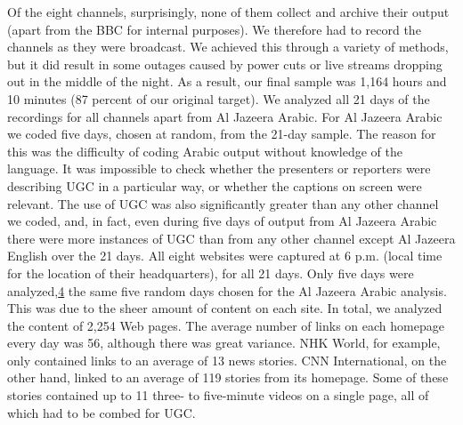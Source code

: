 \documentclass[symmetric, notoc, nobib]{towcenter-book}
\begin{document}
Of the eight channels, surprisingly, none of them collect and archive their
output (apart from the BBC for internal purposes). We therefore had to
record the channels as they were broadcast. We achieved this through a
variety of methods, but it did result in some outages caused by power cuts
or live streams dropping out in the middle of the night. As a result, our final
sample was 1,164 hours and 10 minutes (87 percent of our original target).
We analyzed all 21 days of the recordings for all channels apart from Al
Jazeera Arabic. For Al Jazeera Arabic we coded five days, chosen at random,
from the 21-day sample. The reason for this was the difficulty of coding
Arabic output without knowledge of the language. It was impossible
to check whether the presenters or reporters were describing UGC in a
particular way, or whether the captions on screen were relevant. The use of
UGC was also significantly greater than any other channel we coded, and,
in fact, even during five days of output from Al Jazeera Arabic there were
more instances of UGC than from any other channel except Al Jazeera
English over the 21 days.
All eight websites were captured at 6 p.m. (local time for the location of
their headquarters), for all 21 days. Only five days were analyzed,{\href{#endnotes}{4}} the same
five random days chosen for the Al Jazeera Arabic analysis. This was due to
the sheer amount of content on each site. In total, we analyzed the content
of 2,254 Web pages. The average number of links on each homepage every
day was 56, although there was great variance. NHK World, for example,
only contained links to an average of 13 news stories. CNN International,
on the other hand, linked to an average of 119 stories from its homepage.
Some of these stories contained up to 11 three- to five-minute videos on a
single page, all of which had to be combed for UGC.
\end{document}
